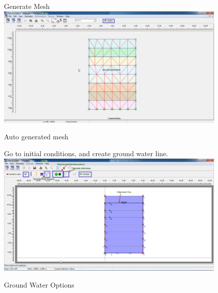 \begin{figure}[hbtp]
  \centering
  \vfill
  Generate Mesh
  \includegraphics[width=\linewidth, height=0.4\textheight,keepaspectratio]{images/plx/a (5).png}
  \caption{Auto generated mesh}
  \vfill
  Go to initial conditions, and create ground water line.
  \includegraphics[width=\linewidth, height=0.4\textheight,keepaspectratio]{images/plx/a (8).png}
  \caption{Ground Water Options}
  \vfill
\end{figure}
\pagebreak


